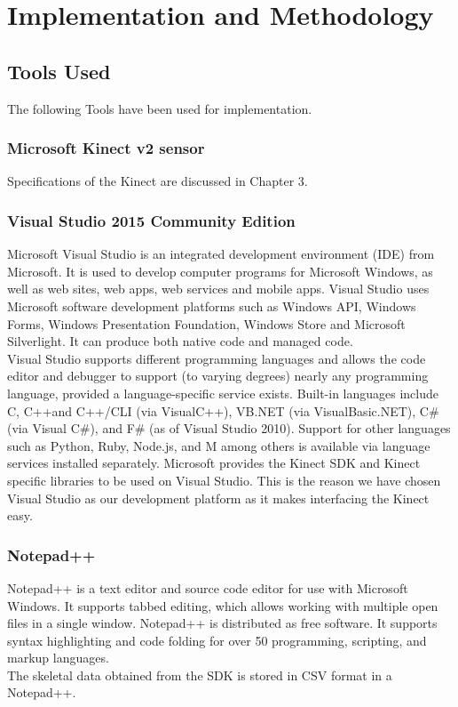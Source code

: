 
\chapter{Implementation and Methodology} \label{Implementation and Methodology}

\section{Tools Used } \label{Tools Used }
\noindent The following Tools have been used for implementation.
\subsection{Microsoft Kinect v2 sensor} \label{Microsoft Kinect v2 sensor} 
\noindent Specifications of the Kinect are discussed in Chapter 3.
\subsection{Visual Studio 2015 Community Edition }\label{Visual Studio 2015 Community Edition }  
\noindent Microsoft Visual Studio is an integrated development environment (IDE) from Microsoft. It is used to develop computer programs for Microsoft Windows, as well as web sites, web apps, web services and mobile apps. Visual Studio uses Microsoft software development platforms such as Windows API, Windows Forms, Windows Presentation Foundation, Windows Store and Microsoft Silverlight. It can produce both native code and managed code.\\
\noindent Visual Studio supports different programming languages and allows the code editor and debugger to support (to varying degrees) nearly any programming language, provided a language-specific service exists. Built-in languages include C, C++and C++/CLI (via VisualC++), VB.NET (via VisualBasic.NET), C\# (via Visual C\#), and F\# (as of Visual Studio 2010). Support for other languages such as Python, Ruby, Node.js, and M among others is available via language services installed separately.
\noindent Microsoft provides the Kinect SDK and Kinect specific libraries to be used on Visual Studio. This is the reason we have chosen Visual Studio as our development platform as it makes interfacing the Kinect easy.   
\subsection{Notepad++ }\label{Notepad++ } 
\noindent Notepad++ is a text editor and source code editor for use with Microsoft Windows. It supports tabbed editing, which allows working with multiple open files in a single window. Notepad++ is distributed as free software. It supports syntax highlighting and code folding for over 50 programming, scripting, and markup languages.\\
The skeletal data obtained from the SDK is stored in CSV format in a Notepad++.

